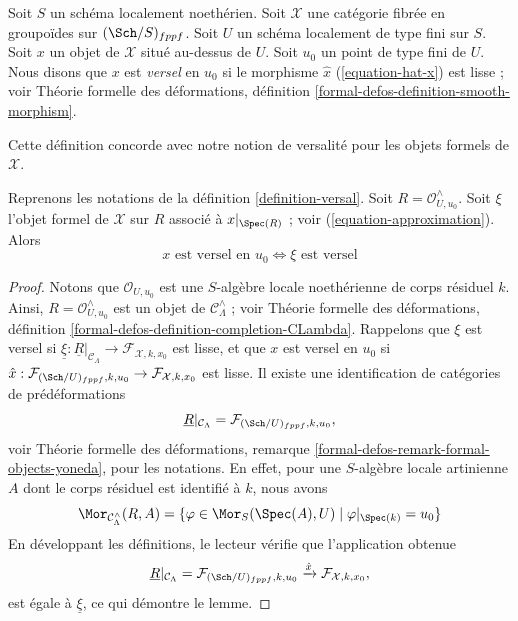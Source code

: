 \begin{definition}
\label{definition-versal}
Soit $S$ un schéma localement noethérien.
Soit $\mathcal{X}$ une catégorie fibrée en groupoïdes sur $(\Sch/S)_{fppf}$.
Soit $U$ un schéma localement de type fini sur $S$.
Soit $x$ un objet de $\mathcal{X}$ situé au-dessus de $U$.
Soit $u_0$ un point de type fini de $U$.
Nous disons que $x$ est {\it versel} en $u_0$ si le morphisme $\hat x$
(\ref{equation-hat-x}) est lisse ; voir Théorie formelle des déformations,
définition \ref{formal-defos-definition-smooth-morphism}.
\end{definition}

\noindent
Cette définition concorde avec notre notion de versalité pour les objets
formels de $\mathcal{X}$.

\begin{lemma}
\label{lemma-versality-matches}
Reprenons les notations de la définition \ref{definition-versal}.
Soit $R = \mathcal{O}_{U, u_0}^\wedge$. Soit $\xi$ l'objet formel de
$\mathcal{X}$ sur $R$ associé à $x|_{\Spec(R)}$ ; voir
(\ref{equation-approximation}). Alors
$$
x\text{ est versel en }u_0
\Leftrightarrow
\xi\text{ est versel}
$$
\end{lemma}

\begin{proof}
Notons que $\mathcal{O}_{U, u_0}$ est une $S$-algèbre locale noethérienne de
corps résiduel $k$. Ainsi, $R = \mathcal{O}_{U, u_0}^\wedge$ est un objet de
$\mathcal{C}_\Lambda^\wedge$ ; voir Théorie formelle des déformations,
définition \ref{formal-defos-definition-completion-CLambda}.
Rappelons que $\xi$ est versel si
$\underline{\xi} : \underline{R}|_{\mathcal{C}_\Lambda} \to
\mathcal{F}_{\mathcal{X}, k, x_0}$
est lisse, et que $x$ est versel en $u_0$ si
$\hat x : \mathcal{F}_{(\Sch/U)_{fppf}, k, u_0}
\to \mathcal{F}_{\mathcal{X}, k, x_0}$ est lisse. Il existe une
identification de catégories de prédéformations
$$
\underline{R}|_{\mathcal{C}_\Lambda}
=
\mathcal{F}_{(\Sch/U)_{fppf}, k, u_0},
$$
voir Théorie formelle des déformations, remarque
\ref{formal-defos-remark-formal-objects-yoneda}, pour les notations. En effet,
pour une $S$-algèbre locale artinienne $A$ dont le corps résiduel est identifié
à $k$, nous avons
$$
\Mor_{\mathcal{C}_\Lambda^\wedge}(R, A) =
\{\varphi \in \Mor_S(\Spec(A), U) \mid \varphi|_{\Spec(k)} = u_0\}
$$
En développant les définitions, le lecteur vérifie que l'application obtenue
$$
\underline{R}|_{\mathcal{C}_\Lambda} =
\mathcal{F}_{(\Sch/U)_{fppf}, k, u_0}
\xrightarrow{\hat x}
\mathcal{F}_{\mathcal{X}, k, x_0},
$$
est égale à $\underline{\xi}$, ce qui démontre le lemme.
\end{proof}

